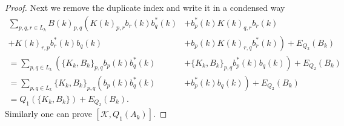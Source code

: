 \documentclass[sn-mathphys,Numbered]{sn-jnl}%
\theoremstyle{plain}
\theoremstyle{definition}
\theoremstyle{remark}
\theoremstyle{plain}
\theoremstyle{definition}
\theoremstyle{remark}
\begin{document}
\begin{proof}
Next we remove the duplicate index and write it in a condensed way
\begin{align}
    \sum\limits_{p,q,r \in L_{k}}B(k)_{p,q}\left(K(k)_{p,r}b_{r}(k)b^*_{q}(k) \right.&+\left. b^*_p(k)K(k)_{q,r}b_{r}(k)\right. \nonumber\\
    +\left. K(k)_{r,p}b^*_{r}(k) b_{q}(k)\right. &+\left. b_{p}(k)K(k)_{r,q}b^*_{r}(k) \right) + E_{Q_2}(B_k)\\
    = \sum\limits_{p,q \in L_{k}} \left(\{K_k,B_k\}_{p,q}b_{p}(k)b^*_{q}(k) \right.&+\left. \{K_k,B_k\}_{p,q}b^*_{p}(k) b_{q}(k)\right) + E_{Q_2}(B_k)\\
    = \sum\limits_{p,q \in L_{k}}\{K_k,B_k\}_{p,q} \left(b_{p}(k)b^*_{q}(k) \right.&+\left.b^*_{p}(k) b_{q}(k)\right) + E_{Q_2}(B_k)\\
    = Q_1(\{K_k,B_k\}) + E_{Q_2}(B_k).
\end{align}
Similarly one can prove $[\mathcal{K}, Q_1(A_k)]$.
\end{proof}
\end{document}
